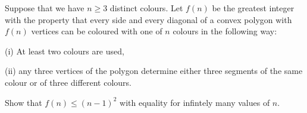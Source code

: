 Suppose that we have $ n \ge 3$ distinct colours. Let $ f(n)$ be the greatest integer with the property that every side and every diagonal of a convex polygon with $ f(n)$ vertices can be coloured with one of $ n$ colours in the following way:

(i) At least two colours are used,

(ii) any three vertices of the polygon determine either three segments of the same colour or of three different colours.

Show that $ f(n) \le (n-1)^2$ with equality for infintely many values of $ n$.